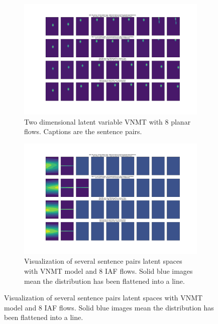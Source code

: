 \begin{figure}
	\centering
	\begin{subfigure}[b]{\textwidth}
		\centering
		\includegraphics[width=\textwidth]{vnmt_planar_flows_plot.pdf}
		\caption{Two dimensional latent variable \ac{VNMT} with 8 planar flows. Captions are the sentence pairs. }
		\label{fig:vnmt_planar}
	\end{subfigure}
	\hfill
	\begin{subfigure}[b]{\textwidth}
		\centering
		\includegraphics[width=\textwidth]{vnmt_iaf_flows_plot.pdf}
		\caption{Visualization of several sentence pairs latent spaces with \ac{VNMT} model and 8 \ac{IAF} flows. Solid blue images mean the distribution has been flattened into a line. }
		\label{fig:vnmt_iaf}
	\end{subfigure}
\end{figure}
